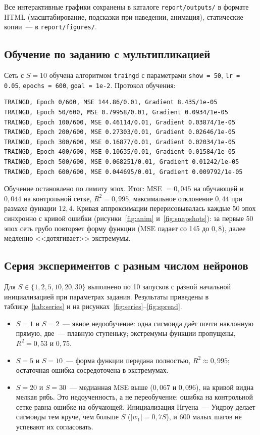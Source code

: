 \documentclass[14pt,a4paper]{extarticle}
\begin{document}
Все интерактивные графики сохранены в каталоге \texttt{report/outputs/} в формате HTML (масштабирование, подсказки при наведении, анимация), статические копии~--- в \texttt{report/figures/}.

\subsection{Обучение по заданию с мультипликацией}

Сеть с $S = 10$ обучена алгоритмом \texttt{traingd} с параметрами \texttt{show = 50}, \texttt{lr = 0.05}, \texttt{epochs = 600}, \texttt{goal = 1e-2}. Протокол обучения:

\begin{verbatim}
TRAINGD, Epoch 0/600, MSE 144.86/0.01, Gradient 8.435/1e-05
TRAINGD, Epoch 50/600, MSE 0.79958/0.01, Gradient 0.0934/1e-05
TRAINGD, Epoch 100/600, MSE 0.46114/0.01, Gradient 0.03874/1e-05
TRAINGD, Epoch 200/600, MSE 0.27303/0.01, Gradient 0.02646/1e-05
TRAINGD, Epoch 300/600, MSE 0.16877/0.01, Gradient 0.02034/1e-05
TRAINGD, Epoch 400/600, MSE 0.10635/0.01, Gradient 0.01584/1e-05
TRAINGD, Epoch 500/600, MSE 0.068251/0.01, Gradient 0.01242/1e-05
TRAINGD, Epoch 600/600, MSE 0.044695/0.01, Gradient 0.009792/1e-05
\end{verbatim}

Обучение остановлено по лимиту эпох. Итог: MSE $= 0{,}045$ на обучающей и $0{,}044$ на контрольной сетке, $R^2 = 0{,}995$, максимальное отклонение $0{,}44$ при размахе функции $12{,}4$. Кривая аппроксимации перерисовывалась каждые 50 эпох синхронно с кривой ошибки (рисунки~\ref{fig:anim} и~\ref{fig:snapshots}): за первые 50 эпох сеть грубо повторяет форму функции (MSE падает со 145 до $0{,}8$), далее медленно <<дотягивает>> экстремумы.

\subsection{Серия экспериментов с разным числом нейронов}

Для $S \in \{1, 2, 5, 10, 20, 30\}$ выполнено по 10 запусков с разной начальной инициализацией при параметрах задания. Результаты приведены в таблице~\ref{tab:series} и на рисунках~\ref{fig:series}--\ref{fig:spread}.



\begin{itemize}
\item $S = 1$ и $S = 2$~--- явное недообучение: одна сигмоида даёт почти наклонную прямую, две~--- плавную ступеньку; экстремумы функции пропущены, $R^2 = 0{,}53$ и $0{,}75$.
\item $S = 5$ и $S = 10$~--- форма функции передана полностью, $R^2 \approx 0{,}995$; остаточная ошибка сосредоточена в экстремумах.
\item $S = 20$ и $S = 30$~--- медианная MSE выше ($0{,}067$ и $0{,}096$), на кривой видна мелкая рябь. Это недоученность, а не переобучение: ошибка на контрольной сетке равна ошибке на обучающей. Инициализация Нгуена~--- Уидроу делает сигмоиды тем круче, чем больше $S$ ($|w_1| = 0{,}7S$), и 600 малых шагов не успевают их согласовать.
\end{itemize}
\end{document}
